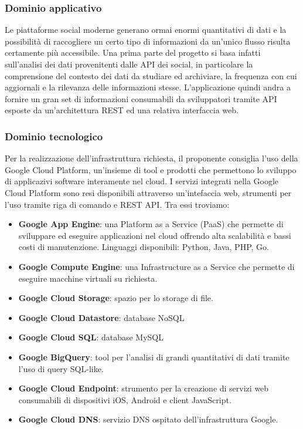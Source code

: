 \subsubsection{Dominio applicativo}
Le piattaforme social moderne generano ormai enormi quantitativi di dati e la possibilità di raccogliere un certo tipo di informazioni da un'unico flusso risulta certamente più accessibile. Una prima parte del progetto si basa infatti sull'analisi dei dati provenitenti dalle API dei social, in particolare la comprensione del contesto dei dati da studiare ed archiviare, la frequenza con cui aggiornali e la rilevanza delle informazioni stesse.
L'applicazione quindi andra a fornire un gran set di informazioni consumabili da sviluppatori tramite API esposte da un'architettura REST ed una relativa interfaccia web. 

\subsubsection{Dominio tecnologico}
Per la realizzazione dell'infrastruttura richiesta, il proponente consiglia l'uso della Google Cloud Platform, un'insieme di tool e prodotti che permettono lo sviluppo di applicazivi software interamente nel cloud. I servizi integrati nella Google Cloud Platform sono resi disponibili attraverso un'intefaccia web, strumenti per l'uso tramite riga di comando e REST API. Tra essi troviamo:
\begin{itemize}
\item \textbf{Google App Engine}: una Platform as a Service (PaaS) che permette di sviluppare ed eseguire applicazioni nel cloud offrendo alta scalabilità e bassi costi di manutenzione. Linguaggi disponibili: Python, Java, PHP, Go.
\item \textbf{Google Compute Engine}: una Infrastructure as a Service che permette di eseguire macchine virtuali su richiesta.
\item \textbf{Google Cloud Storage}: spazio per lo storage di file.
\item \textbf{Google Cloud Datastore}: database NoSQL
\item \textbf{Google Cloud SQL}: database MySQL
\item \textbf{Google BigQuery}: tool per l'analisi di grandi quantitativi di dati tramite l'uso di query SQL-like.
\item \textbf{Google Cloud Endpoint}: strumento per la creazione di servizi web consumabili di dispositivi iOS, Android e client JavaScript.
\item \textbf{Google Cloud DNS}: servizio DNS ospitato dell'infrastruttura Google.
\end{itemize}
